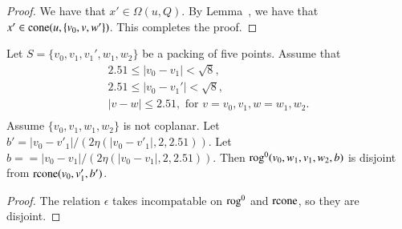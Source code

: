\begin{tarskidata}
\begin{tarski}
\begin{proof}
We have that $x'\in\Omega(u,Q)$.  By Lemma~,
we have that $x'\in{\operatorname{cone}}(u,\{v_0,v,w'\})$.  This completes
the proof.
\end{proof}
\end{tarski}






\begin{tarski}

\begin{lemma}
Let $S=\{v_0,v_1,v_1',w_1,w_2\}$ be a packing of five points.
  Assume that
  $$\begin{array}{lll}
  2.51 \le |v_0-v_1| < \sqrt8,\\
  2.51\le |v_0-v_1'| < \sqrt8,\\
  |v-w|\le 2.51, \text{ for } v=v_0,v_1, w=w_1,w_2.\\
  \end{array}
  $$
Assume $\{v_0,v_1,w_1,w_2\}$ is not coplanar.  
Let $b' = |v_0-v'_1|/(2\eta(|v_0-v'_1|,2,2.51))$.  
Let $b== |v_0-v_1|/(2\eta(|v_0-v_1|,2,2.51))$.  
Then
${\operatorname{rog}}^0(v_0,w_1,v_1,w_2,b)$ is disjoint from ${\operatorname{rcone}}(v_0,v_1',b')$.
\end{lemma}


\begin{proof} The relation $\epsilon$ takes incompatable on
${\operatorname{rog}}^0$ and ${\operatorname{rcone}}$, so they are disjoint.
\end{proof}
\end{tarski}






\begin{tarski}


\end{tarski}
\end{tarskidata}
